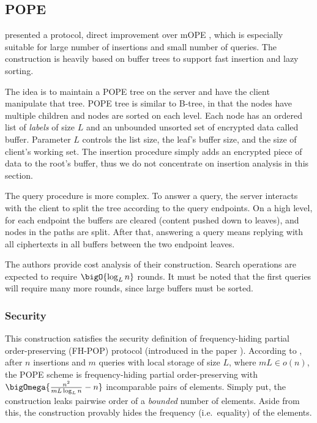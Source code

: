 \subsection{POPE}

	\textcite{pope} presented a protocol, direct improvement over mOPE \cite{ope-ideal-security-protocol}, which is especially suitable for large number of insertions and small number of queries.
	The construction is heavily based on buffer trees \cite{buffer-tree} to support fast insertion and lazy sorting.

	The idea is to maintain a POPE tree on the server and have the client manipulate that tree.
	POPE tree is similar to B-tree, in that the nodes have multiple children and nodes are sorted on each level.
	Each node has an ordered list of \emph{labels} of size $L$ and an unbounded unsorted set of encrypted data called buffer.
	Parameter $L$ controls the list size, the leaf's buffer size, and the size of client's working set.
	The insertion procedure simply adds an encrypted piece of data to the root's buffer, thus we do not concentrate on insertion analysis in this section.

	The query procedure is more complex.
	To answer a query, the server interacts with the client to split the tree according to the query endpoints.
	On a high level, for each endpoint the buffers are cleared (content pushed down to leaves), and nodes in the paths are split.
	After that, answering a query means replying with all ciphertexts in all buffers between the two endpoint leaves.

	The authors provide cost analysis of their construction.
	Search operations are expected to require $\bigO{\log_L n}$ rounds.
	It must be noted that the first queries will require many more rounds, since large buffers must be sorted.

	\subsubsection{Security}

		This construction satisfies the security definition of frequency\hyp{}hiding partial order-preserving (FH-POP) protocol (introduced in the paper \cite{pope}).
		According to \cite[Theorem~3]{pope}, after $n$ insertions and $m$ queries with local storage of size $L$, where $m L \in o(n)$, the POPE scheme is frequency-hiding partial order-preserving with $\bigOmega{ \frac{n^2}{mL \log_L n} - n }$ incomparable pairs of elements. %
		Simply put, the construction leaks pairwise order of a \emph{bounded} number of elements.
		Aside from this, the construction provably hides the frequency (i.e.\ equality) of the elements.

